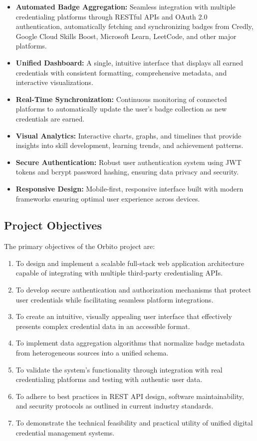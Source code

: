 \documentclass[12pt,a4paper]{article}
\begin{document}
\begin{itemize}[leftmargin=*]
    \item \textbf{Automated Badge Aggregation:} Seamless integration with multiple credentialing platforms through RESTful APIs and OAuth 2.0 authentication, automatically fetching and synchronizing badges from Credly, Google Cloud Skills Boost, Microsoft Learn, LeetCode, and other major platforms.
    \item \textbf{Unified Dashboard:} A single, intuitive interface that displays all earned credentials with consistent formatting, comprehensive metadata, and interactive visualizations.
    \item \textbf{Real-Time Synchronization:} Continuous monitoring of connected platforms to automatically update the user's badge collection as new credentials are earned.
    \item \textbf{Visual Analytics:} Interactive charts, graphs, and timelines that provide insights into skill development, learning trends, and achievement patterns.
    \item \textbf{Secure Authentication:} Robust user authentication system using JWT tokens and bcrypt password hashing, ensuring data privacy and security.
    \item \textbf{Responsive Design:} Mobile-first, responsive interface built with modern frameworks ensuring optimal user experience across devices.
\end{itemize}

\subsection{Project Objectives}
The primary objectives of the Orbito project are:

\begin{enumerate}[leftmargin=*]
    \item To design and implement a scalable full-stack web application architecture capable of integrating with multiple third-party credentialing APIs.
    \item To develop secure authentication and authorization mechanisms that protect user credentials while facilitating seamless platform integrations.
    \item To create an intuitive, visually appealing user interface that effectively presents complex credential data in an accessible format.
    \item To implement data aggregation algorithms that normalize badge metadata from heterogeneous sources into a unified schema.
    \item To validate the system's functionality through integration with real credentialing platforms and testing with authentic user data.
    \item To adhere to best practices in REST API design, software maintainability, and security protocols as outlined in current industry standards.
    \item To demonstrate the technical feasibility and practical utility of unified digital credential management systems.
\end{enumerate}
\end{document}
